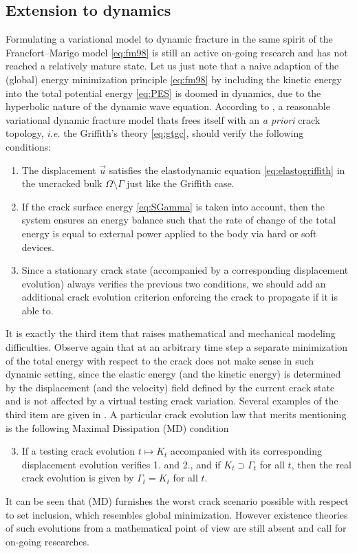 \subsection{Extension to dynamics}
Formulating a variational model to dynamic fracture in the same spirit of the Francfort--Marigo model \eqref{eq:fm98} is still an active on-going research and has not reached a relatively mature state. Let us just note that a naive adaption of the (global) energy minimization principle \eqref{eq:fm98} by including the kinetic energy into the total potential energy \eqref{eq:PES} is doomed in dynamics, due to the hyperbolic nature of the dynamic wave equation. According to \cite{Larsen:2010}, a reasonable variational dynamic fracture model thats frees itself with an \emph{a priori} crack topology, \emph{i.e.} the Griffith's theory \eqref{eq:gtgc}, should verify the following conditions:
\begin{enumerate}
\item The displacement $\vec{u}$ satisfies the elastodynamic equation \eqref{eq:elastogriffith} in the uncracked bulk $\Omega\setminus\Gamma$ just like the Griffith case.

\item If the crack surface energy \eqref{eq:SGamma} is taken into account, then the system ensures an energy balance such that the rate of change of the total energy is equal to external power applied to the body via hard or soft devices.

\item Since a stationary crack state (accompanied by a corresponding displacement evolution) always verifies the previous two conditions, we should add an additional crack evolution criterion enforcing the crack to propagate if it is able to.
\end{enumerate}

It is exactly the third item that raises mathematical and mechanical modeling difficulties. Observe again that at an arbitrary time step a separate minimization of the total energy with respect to the crack does not make sense in such dynamic setting, since the elastic energy (and the kinetic energy) is determined by the displacement (and the velocity) field defined by the current crack state and is not affected by a virtual testing crack variation. Several examples of the third item are given in \cite{Larsen:2010}. A particular crack evolution law that merits mentioning is the following Maximal Dissipation (MD) condition
\begin{enumerate}
\setcounter{enumi}{2}
\item If a testing crack evolution $t\mapsto K_t$ accompanied with its corresponding displacement evolution verifies 1. and 2., and if $K_t\supset\Gamma_t$ for all $t$, then the real crack evolution is given by $\Gamma_t=K_t$ for all $t$.
\end{enumerate}
It can be seen that (MD) furnishes the worst crack scenario possible with respect to set inclusion, which resembles global minimization. However existence theories of such evolutions from a mathematical point of view are still absent and call for on-going researches.

